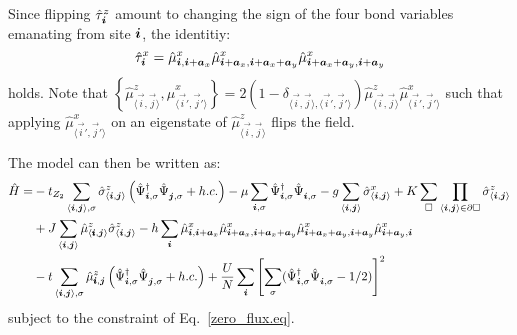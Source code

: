 Since flipping  $\hat{\tau}^{z}_{ \boldsymbol{i}} $  amount to changing the sign of the four  bond variables emanating from site $\boldsymbol{i}$,  the identitiy:
\begin{equation}
\hat{\tau}^x_{\boldsymbol{i}}  = \hat{\mu}^{x}_{\boldsymbol{i},\boldsymbol{i} + \boldsymbol{a}_x } \hat{\mu}^{x}_{\boldsymbol{i} + \boldsymbol{a}_x, \boldsymbol{i} + \boldsymbol{a}_x + \boldsymbol{a}_y }   \hat{\mu}^{x}_{\boldsymbol{i} + \boldsymbol{a}_x + \boldsymbol{a}_y, \boldsymbol{i} + \boldsymbol{a}_y  }
\end{equation}
holds.  
Note that $\left\{ \hat{\mu}^{z}_{\langle \vec{i}, \vec{j} \rangle} , \hat{\mu}^x_{\langle \vec{i}', \vec{j}'  \rangle} \right\}  =  2 \left( 1 -  \delta_{\langle \vec{i}, \vec{j}  \rangle, \langle \vec{i}', \vec{j}'  \rangle } \right) 
\hat{\mu}^{z}_{\langle \vec{i}, \vec{j} \rangle}  \hat{\mu}^x_{\langle \vec{i}', \vec{j}'  \rangle} $    such that applying $\hat{\mu}^x_{\langle \vec{i}', \vec{j}'  \rangle}$  on an eigenstate of  $\hat{\mu}^{z}_{\langle \vec{i}, \vec{j} \rangle}$  flips the 
field. 


The model  can then be written as:
\begin{align}
	\hat{H} =& -  t_{Z_2} \sum_{\langle \vec{i}, \vec{j} \rangle, \sigma } \hat{\sigma}^z_{\langle \vec{i}, \vec{j} \rangle}
	\left(\hat{\Psi}^{\dagger}_{\vec{i},\sigma} \hat{\Psi}^{\phantom{\dagger}}_{\vec{j},\sigma}   + h.c. \right) - \mu \sum_{\vec{i},\sigma} \hat{\Psi}^{\dagger}_{\vec{i},\sigma} \hat{\Psi}^{\phantom{\dagger}}_{\vec{i},\sigma}  
	-g \sum_{\langle \vec{i}, \vec{j} \rangle } \hat{\sigma}^{x}_{\langle \vec{i}, \vec{j} \rangle }  +
	  K \sum_{\square} \prod_{\langle \vec{i}, \vec{j} \rangle \in \partial \square} \hat{\sigma}^{z}_{\langle \vec{i}, \vec{j} \rangle}  \nonumber \\
	& + J  \sum_{\langle \vec{i}, \vec{j} \rangle}  \hat{\mu}^z_{ \langle \pmb{i}, \ve{j} \rangle }  \hat{\sigma}^{z}_{\langle \vec{i}, \vec{j} \rangle}    
	      -  h \sum_{ \vec{i} } \hat{\mu}^{x}_{\ve{i},\ve{i} + \ve{a}_x } \hat{\mu}^{x}_{\ve{i} + \ve{a}_x, \ve{i} + \ve{a}_x + \ve{a}_y }   \hat{\mu}^{x}_{\ve{i} + \ve{a}_x + \ve{a}_y, \ve{i} + \ve{a}_y  }
	         \hat{\mu}^{x}_{\ve{i} + \ve{a}_y, \ve{i}  }	  \\      
	&        - t  \sum_{\langle \vec{i}, \vec{j} \rangle, \sigma }   \hat{\mu}^z_{\pmb{i},\ve{j}}    \left( \hat{\Psi}^{\dagger}_{\vec{i},\sigma} \hat{\Psi}^{\phantom{\dagger}}_{\vec{j},\sigma} 	+ h.c. \right) + \frac{U}{N}\sum_{\ve{i}} \left[ \sum_{\sigma}  ( \hat{\Psi}^{\dagger}_{\ve{i},\sigma}  \hat{\Psi}^{\phantom\dagger}_{\ve{i},\sigma} - 1/2 ) \right]^2 
\end{align}  
subject to the constraint of Eq.~\ref{zero_flux.eq}.  

